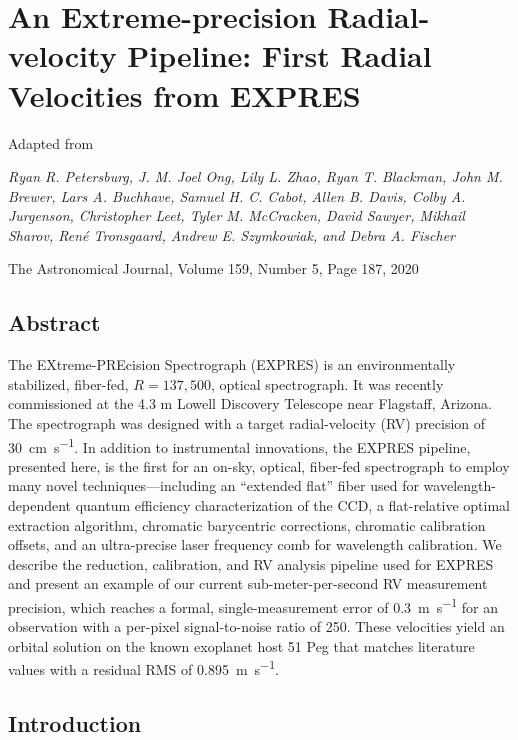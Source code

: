 \chapter{An Extreme-precision Radial-velocity Pipeline: First Radial Velocities from EXPRES}\label{chapter:pipeline}

\begin{center}
    Adapted from

    \textit{Ryan R. Petersburg, J. M. Joel Ong, Lily L. Zhao, Ryan T. Blackman, John M. Brewer, Lars A. Buchhave, Samuel H. C. Cabot, Allen B. Davis, Colby A. Jurgenson, Christopher Leet, Tyler M. McCracken, David Sawyer, Mikhail Sharov, Ren\'e Tronsgaard, Andrew E. Szymkowiak, and Debra A. Fischer}
    
    The Astronomical Journal, Volume 159, Number 5, Page 187, 2020
\end{center}

\section*{Abstract}

The EXtreme-PREcision Spectrograph (EXPRES) is an environmentally stabilized, fiber-fed, $R=137,500$, optical spectrograph. It was recently commissioned at the 4.3 m Lowell Discovery Telescope near Flagstaff, Arizona. The spectrograph was designed with a target radial-velocity (RV) precision of 30~\si{\centi\meter\per\second}. In addition to instrumental innovations, the EXPRES pipeline, presented here, is the first for an on-sky, optical, fiber-fed spectrograph to employ many novel techniques---including an ``extended flat'' fiber used for wavelength-dependent quantum efficiency characterization of the CCD, a flat-relative optimal extraction algorithm, chromatic barycentric corrections, chromatic calibration offsets, and an ultra-precise laser frequency comb for wavelength calibration. We describe the reduction, calibration, and RV analysis pipeline used for EXPRES and present an example of our current sub-meter-per-second RV measurement precision, which reaches a formal, single-measurement error of 0.3~\si{\meter\per\second} for an observation with a per-pixel signal-to-noise ratio of 250. These velocities yield an orbital solution on the known exoplanet host 51 Peg that matches literature values with a residual RMS of 0.895~\si{\meter\per\second}.

\section{Introduction}
\label{pipeline:intro}

